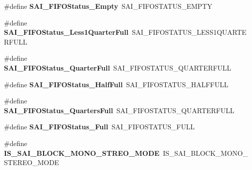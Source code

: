 \begin{DoxyCompactItemize}
\item 
\mbox{\label{group___h_a_l___s_a_i___aliased___macros_ga975ffaf2925f238e84e4ec58ff07507a}} 
\#define {\bfseries S\+A\+I\+\_\+\+F\+I\+F\+O\+Status\+\_\+\+Empty}~S\+A\+I\+\_\+\+F\+I\+F\+O\+S\+T\+A\+T\+U\+S\+\_\+\+E\+M\+P\+TY
\item 
\mbox{\label{group___h_a_l___s_a_i___aliased___macros_ga8bf03716c694dc3221b640dc5de670b6}} 
\#define {\bfseries S\+A\+I\+\_\+\+F\+I\+F\+O\+Status\+\_\+\+Less1\+Quarter\+Full}~S\+A\+I\+\_\+\+F\+I\+F\+O\+S\+T\+A\+T\+U\+S\+\_\+\+L\+E\+S\+S1\+Q\+U\+A\+R\+T\+E\+R\+F\+U\+LL
\item 
\mbox{\label{group___h_a_l___s_a_i___aliased___macros_ga521399b510e0f29fc41fb516a27fe517}} 
\#define {\bfseries S\+A\+I\+\_\+\+F\+I\+F\+O\+Status\+\_\+Quarter\+Full}~S\+A\+I\+\_\+\+F\+I\+F\+O\+S\+T\+A\+T\+U\+S\+\_\+Q\+U\+A\+R\+T\+E\+R\+F\+U\+LL
\item 
\mbox{\label{group___h_a_l___s_a_i___aliased___macros_gafe9200ac26339d1334ab978ae508f352}} 
\#define {\bfseries S\+A\+I\+\_\+\+F\+I\+F\+O\+Status\+\_\+\+Half\+Full}~S\+A\+I\+\_\+\+F\+I\+F\+O\+S\+T\+A\+T\+U\+S\+\_\+\+H\+A\+L\+F\+F\+U\+LL
\item 
\mbox{\label{group___h_a_l___s_a_i___aliased___macros_ga50b6fc16c49a0d4eb2575567f5e9be98}} 
\#define {\bfseries S\+A\+I\+\_\+\+F\+I\+F\+O\+Status\+\_\+Quarters\+Full}~S\+A\+I\+\_\+\+F\+I\+F\+O\+S\+T\+A\+T\+U\+S\+\_\+Q\+U\+A\+R\+T\+E\+R\+F\+U\+LL
\item 
\mbox{\label{group___h_a_l___s_a_i___aliased___macros_ga5e2fd1ac3cea38c8c2fe15cf70efe61a}} 
\#define {\bfseries S\+A\+I\+\_\+\+F\+I\+F\+O\+Status\+\_\+\+Full}~S\+A\+I\+\_\+\+F\+I\+F\+O\+S\+T\+A\+T\+U\+S\+\_\+\+F\+U\+LL
\item 
\mbox{\label{group___h_a_l___s_a_i___aliased___macros_gaa9eb7424d1a759fa3c84ee598b6d53a1}} 
\#define {\bfseries I\+S\+\_\+\+S\+A\+I\+\_\+\+B\+L\+O\+C\+K\+\_\+\+M\+O\+N\+O\+\_\+\+S\+T\+R\+E\+O\+\_\+\+M\+O\+DE}~I\+S\+\_\+\+S\+A\+I\+\_\+\+B\+L\+O\+C\+K\+\_\+\+M\+O\+N\+O\+\_\+\+S\+T\+E\+R\+E\+O\+\_\+\+M\+O\+DE

\end{DoxyCompactItemize}
